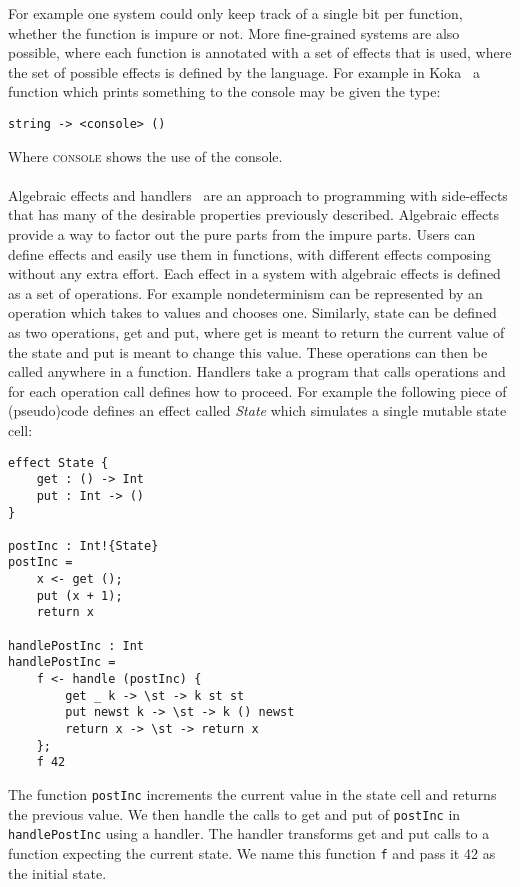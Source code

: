 For example one system could only keep track of a single bit per function, whether the function is impure or not.
More fine-grained systems are also possible, where each function is annotated with a set of effects that is used, where the set of possible effects is defined by the language.
For example in Koka~\autocite{koka2} a function which prints something to the console may be given the type:
\begin{verbatim}
string -> <console> () 
\end{verbatim}
Where \textsc{console} shows the use of the console.
\\\\
Algebraic effects and handlers~\autocite{algeff} are an approach to programming with side-effects that has many of the desirable properties previously described.
Algebraic effects provide a way to factor out the pure parts from the impure parts.
Users can define effects and easily use them in functions, with different effects composing without any extra effort.
Each effect in a system with algebraic effects is defined as a set of operations.
For example nondeterminism can be represented by an operation which takes to values and chooses one.
Similarly, state can be defined as two operations, get and put, where get is meant to return the current value of the state and put is meant to change this value.
These operations can then be called anywhere in a function.
Handlers take a program that calls operations and for each operation call defines how to proceed.
For example the following piece of (pseudo)code defines an effect called \textit{State} which simulates a single mutable state cell:
\begin{verbatim}
effect State {
	get : () -> Int
	put : Int -> ()
}

postInc : Int!{State}
postInc =
	x <- get ();
	put (x + 1);
	return x
	
handlePostInc : Int
handlePostInc =
	f <- handle (postInc) {
		get _ k -> \st -> k st st
		put newst k -> \st -> k () newst
		return x -> \st -> return x
	};
	f 42
\end{verbatim}
The function \texttt{postInc} increments the current value in the state cell and returns the previous value.
We then handle the calls to get and put of \texttt{postInc} in \texttt{handlePostInc} using a handler.
The handler transforms get and put calls to a function expecting the current state.
We name this function \texttt{f} and pass it 42 as the initial state.

